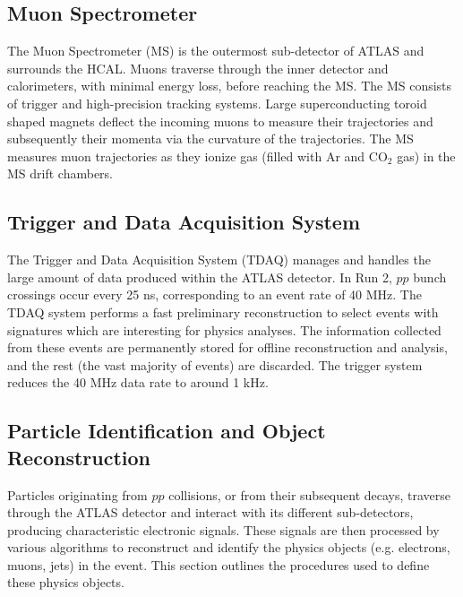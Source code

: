 \subsection{Muon Spectrometer}
The Muon Spectrometer (MS) is the outermost sub-detector of ATLAS and surrounds the HCAL. Muons traverse through the inner detector and calorimeters, with minimal energy loss, before reaching the MS. The MS consists of trigger and high-precision tracking systems. Large superconducting toroid shaped magnets deflect the incoming muons to measure their trajectories and subsequently their momenta via the curvature of the trajectories. The MS measures muon trajectories as they ionize gas (filled with Ar and CO$_{2}$ gas) in the MS drift chambers.

\subsection{Trigger and Data Acquisition System}
The Trigger and Data Acquisition System (TDAQ) manages and handles the large amount of data produced within the ATLAS detector. In Run 2, $pp$ bunch crossings occur every 25 ns, corresponding to an event rate of 40 MHz. The TDAQ system performs a fast preliminary reconstruction to select events with signatures which are interesting for physics analyses. The information collected from these events are permanently stored for offline reconstruction and analysis, and the rest (the vast majority of events) are discarded. The trigger system reduces the 40 MHz data rate to around 1 kHz.


\subsection{Particle Identification and Object Reconstruction}


Particles originating from $pp$ collisions, or from their subsequent decays, traverse through the ATLAS detector and interact with its different sub-detectors, producing characteristic electronic signals. These signals are then processed by various algorithms to reconstruct and identify the physics objects (e.g. electrons, muons, jets) in the event. This section outlines the procedures used to define these physics objects.

